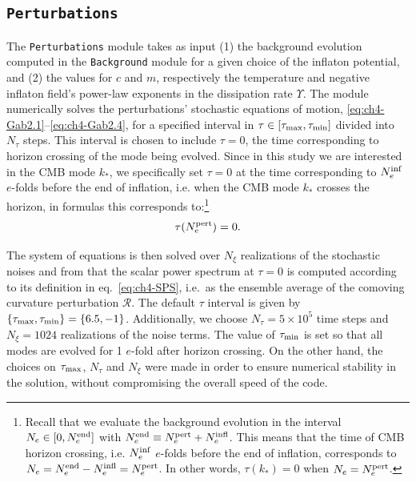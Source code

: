 \subsection{\texttt{Perturbations}}
\label{sec:ch4-perturbations_code}

The \texttt{Perturbations} module takes as input (1) the background evolution computed in the \texttt{Background} module for a given choice of the inflaton potential, and (2) the values for $c$ and $m$, respectively the temperature and negative inflaton field's power-law exponents in the dissipation rate $\Upsilon$. The module numerically solves the perturbations' stochastic equations of motion, \eqref{eq:ch4-Gab2.1}--\eqref{eq:ch4-Gab2.4}, for a specified interval in $\tau\in [\tau_{\rm{max}},\tau_{\rm{min}}]$ divided into $N_\tau$ steps. This interval is chosen to include $\tau=0$, the time corresponding to horizon crossing of the mode being evolved. Since in this study we are interested in the CMB mode $k_{*}$, we specifically set $\tau=0$ at the time corresponding to $N_e^{\rm{inf}}$ $e$-folds before the end of inflation, i.e. when the CMB mode $k_{*}$ crosses the horizon, in formulas this corresponds to:\footnote{Recall that we evaluate the background evolution in the interval $N_e\in[0,N_e^{\rm{end}}]$ with $N_e^{\rm{end}}\equiv N_e^{\rm{pert}}+N_e^{\rm{infl}}$. This means that the time of CMB horizon crossing, i.e. $N_e^{\rm{inf}}$ $e$-folds before the end of inflation, corresponds to $N_e=N_e^{\rm{end}}-N_e^{\rm{infl}}=N_e^{\rm{pert}}$. In other words, $\tau(k_*)=0$ when $N_e=N_e^{\rm{pert}}$.}
\begin{equation}
    \tau(N_e^{\rm{pert}})=0.
\end{equation} 

The system of equations is then solved over $N_\xi$ realizations of the stochastic noises and from that the scalar power spectrum at $\tau=0$ is computed according to its definition in eq.~\eqref{eq:ch4-SPS},  i.e.\ as the ensemble average of the comoving curvature perturbation $\mathcal{R}$. The default $\tau$ interval is given by $\{\tau_{\rm{max}},\tau_{\rm{min}}\}=\{6.5,-1\}$. Additionally, we choose $N_\tau=5\times10^{5}$ time steps and $N_\xi=1024$ realizations of the noise terms. The value of $\tau_{\rm{min}}$ is set so that all modes are evolved for 1 $e$-fold after horizon crossing. On the other hand, the choices on $\tau_{\rm{max}}$, $N_\tau$ and $N_\xi$ were made in order to ensure numerical stability in the solution, without compromising the overall speed of the code. 

